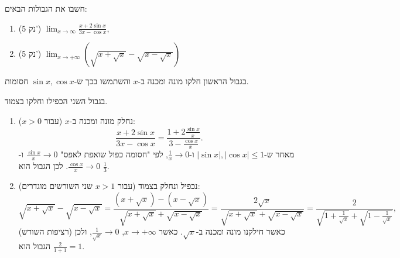 
\begin{question}
חשבו את הגבולות הבאים:
\begin{enumerate}
  \item (5 נק') $\displaystyle\lim_{x\to\infty}\frac{x+2\sin x}{3x-\cos x}$,
  \item (5 נק') $\displaystyle\lim_{x\to+\infty}\left(\sqrt{x+\sqrt{x}}-\sqrt{x-\sqrt{x}}\right)$
\end{enumerate}
\end{question}

\begin{hint}
בגבול הראשון חלקו מונה ומכנה ב-$x$ והשתמשו בכך ש-$\sin x,\cos x$ חסומות.
\end{hint}

\begin{hint}
בגבול השני הכפילו וחלקו בצמוד.
\end{hint}

\begin{solution}
\begin{enumerate}
  \item נחלק מונה ומכנה ב-$x$ (עבור $x>0$):
  \[ \frac{x+2\sin x}{3x-\cos x}=\frac{1+2\frac{\sin x}{x}}{3-\frac{\cos x}{x}} . \]
  מאחר ש-$|\sin x|,|\cos x|\le1$ ו-$\frac1x\to0$, לפי "חסומה כפול שואפת לאפס" $\frac{\sin x}{x}\to0$ ו-$\frac{\cos x}{x}\to0$. לכן הגבול הוא $\boxed{\frac13}$.
  \item נכפיל ונחלק בצמוד (עבור $x>1$ שני השורשים מוגדרים):
  \[ \sqrt{x+\sqrt x}-\sqrt{x-\sqrt x}=\frac{(x+\sqrt x)-(x-\sqrt x)}{\sqrt{x+\sqrt x}+\sqrt{x-\sqrt x}}=\frac{2\sqrt x}{\sqrt{x+\sqrt x}+\sqrt{x-\sqrt x}}
  =\frac{2}{\sqrt{1+\frac{1}{\sqrt x}}+\sqrt{1-\frac{1}{\sqrt x}}} , \]
  כאשר חילקנו מונה ומכנה ב-$\sqrt x$. כאשר $x\to+\infty$, $\frac{1}{\sqrt x}\to0$, ולכן (רציפות השורש) הגבול הוא $\frac{2}{1+1}=\boxed{1}$.
\end{enumerate}
\end{solution}
